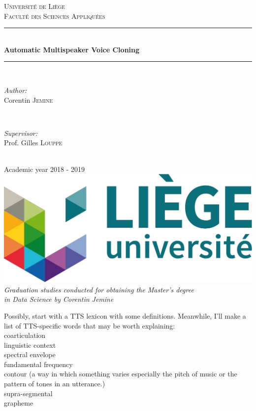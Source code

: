 \documentclass[a4paper, oneside]{article}
\begin{document}
\begin{titlepage}
	\newcommand{\HRule}{\rule{\linewidth}{0.5mm}}
	\center
	\textsc{\LARGE Université de Liège}\\[1cm]
	\textsc{\Large Faculté des Sciences Appliquées}\\[2cm]
		
	\HRule \\[0.5cm]
	{ \huge \bfseries Automatic Multispeaker Voice Cloning}\\[0.2cm]
	\HRule \\[3cm]

	\begin{minipage}{0.4\textwidth}
		\begin{flushleft} \Large
			\emph{Author:}\\
			Corentin \textsc{Jemine}
		\end{flushleft}
	\end{minipage}
	~
	\begin{minipage}{0.4\textwidth}
		\begin{flushright} \Large
			\emph{Supervisor:} \\
			Prof. Gilles \textsc{Louppe}
		\end{flushright}
	\end{minipage}\\[4cm]
	
	{\LARGE Academic year 2018 - 2019}\\[2cm]
	
	\includegraphics{images/uliege_logo.jpg}\\[1.25cm]
	
	\textit{Graduation studies conducted for obtaining the Master's degree \\in Data Science by Corentin Jemine}
	
	\vfill
\end{titlepage}

\setcounter{page}{2}

\color{red}
Possibly, start with a TTS lexicon with some definitions. Meanwhile, I'll make a list of TTS-specific words that may be worth explaining:\\
coarticulation\\
linguistic context\\
spectral envelope\\
fundamental frequency\\
contour (a way in which something varies especially the pitch of music or the pattern of tones in an utterance.)\\
supra-segmental\\
grapheme
\color{black}
\clearpage
\end{document}
